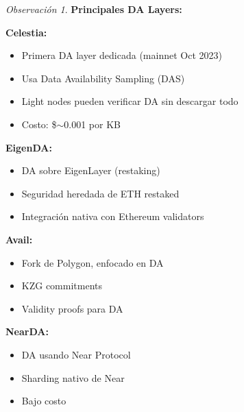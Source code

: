 \documentclass[11pt,a4paper,twoside,openright]{book}
\theoremstyle{definition}
\theoremstyle{plain}
\theoremstyle{remark}
\newtheorem{remark}{Observación}[chapter]
\begin{document}
\begin{remark}
\textbf{Principales DA Layers:}

\textbf{Celestia:}
\begin{itemize}
    \item Primera DA layer dedicada (mainnet Oct 2023)
    \item Usa Data Availability Sampling (DAS)
    \item Light nodes pueden verificar DA sin descargar todo
    \item Costo: \$$\sim$0.001 por KB
\end{itemize}

\textbf{EigenDA:}
\begin{itemize}
    \item DA sobre EigenLayer (restaking)
    \item Seguridad heredada de ETH restaked
    \item Integración nativa con Ethereum validators
\end{itemize}

\textbf{Avail:}
\begin{itemize}
    \item Fork de Polygon, enfocado en DA
    \item KZG commitments
    \item Validity proofs para DA
\end{itemize}

\textbf{NearDA:}
\begin{itemize}
    \item DA usando Near Protocol
    \item Sharding nativo de Near
    \item Bajo costo
\end{itemize}
\end{remark}
\end{document}
